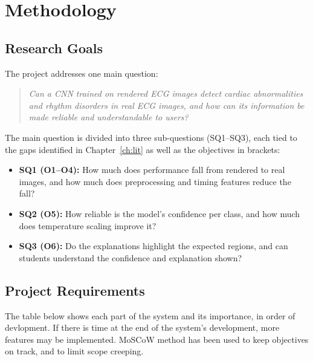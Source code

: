
\chapter{Methodology}
\label{ch:method}

\section{Research Goals}
\label{sec:goals}
The project addresses one main question:
\begin{quote}
\emph{Can a CNN trained on rendered ECG images detect cardiac abnormalities and rhythm disorders in real ECG images, and how can its information be made reliable and understandable to users?}
\end{quote} 
The main question is divided into three sub-questions (SQ1--SQ3), each tied to the gaps identified
in Chapter~\ref{ch:lit} as well as the objectives in brackets:
\begin{itemize}
  \item \textbf{SQ1 (O1--O4):} How much does performance fall from rendered to real images, and how much does preprocessing and timing features reduce the fall?
  \item \textbf{SQ2 (O5):} How reliable is the model's confidence per class, and how much does temperature scaling improve it?
  \item \textbf{SQ3 (O6):} Do the explanations highlight the expected regions, and can students understand the confidence and explanation shown?
\end{itemize}

\section{Project Requirements}
The table below shows each part of the system and its importance, in order of devlopment. If there is time at the end of the system's development, more features may be implemented. MoSCoW method has been used to keep objectives on track, and to limit scope creeping.

